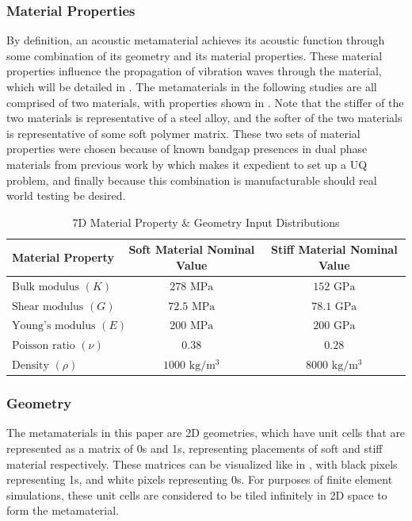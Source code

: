 \documentclass[preprint,review,12pt]{elsarticle}
\begin{document}
\subsubsection{Material Properties}
By definition, an acoustic metamaterial achieves its acoustic function through some combination of its geometry and its material properties. These material properties influence the propagation of vibration waves through the material, which will be detailed in . The metamaterials in the following studies are all comprised of two materials, with properties shown in . Note that the stiffer of the two materials is representative of a steel alloy, and the softer of the two materials is representative of some soft polymer matrix. These two sets of material properties were chosen because of known bandgap presences in dual phase materials from previous work by \citep{CHEN2022101895} which makes it expedient to set up a UQ problem, and finally because this combination is manufacturable should real world testing be desired.

\begin{table}[H]
\centering
\small
\caption{7D Material Property \& Geometry Input Distributions}
\label{table:Material Properties}
\begin{tabularx}{\linewidth}{Xcc} 
\toprule
Material Property & Soft Material Nominal Value & Stiff Material Nominal Value \\
\midrule
\( \text{Bulk modulus } (K)\) & \( 278 \text{ MPa} \) & \( 152 \text{ GPa} \) \\
\( \text{Shear modulus } (G)\) & \( 72.5 \text{ MPa} \) & \( 78.1 \text{ GPa} \) \\
\( \text{Young's modulus } (E)\) & \( 200 \text{ MPa} \) & \( 200 \text{ GPa} \) \\
\( \text{Poisson ratio } (\nu)\) & \( 0.38 \) & \( 0.28 \) \\
\( \text{Density } (\rho)\) & \( 1000 \text{ kg/m$^3$} \) & \( 8000 \text{ kg/m$^3$} \) \\
\bottomrule
\end{tabularx}
\end{table}
\subsubsection{Geometry}
The metamaterials in this paper are 2D geometries, which have unit cells that are represented as a matrix of 0s and 1s, representing placements of soft and stiff material respectively. These matrices can be visualized like in , with black pixels representing 1s, and white pixels representing 0s. For purposes of finite element simulations, these unit cells are considered to be tiled infinitely in 2D space to form the metamaterial.
\end{document}
